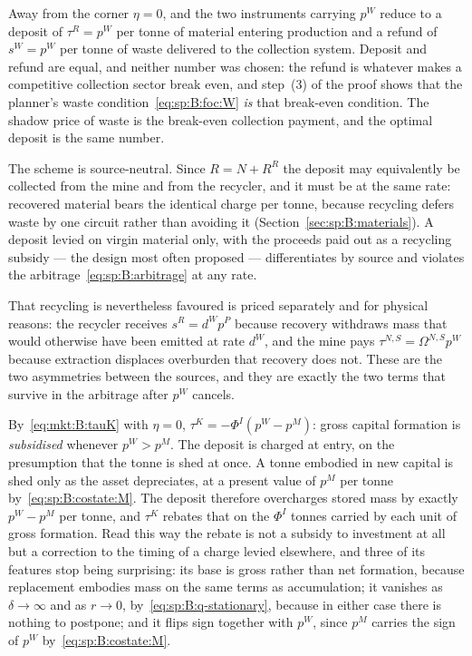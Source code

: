  Away from the corner $\eta=0$, and
the two instruments carrying $p^W$ reduce to a deposit of $\tau^R=p^W$ per tonne of material entering
production and a refund of $s^W=p^W$ per tonne of waste delivered to the collection system. Deposit and
refund are equal, and neither number was chosen: the refund is whatever makes a competitive collection
sector break even, and step~(3) of the proof shows that the planner's waste
condition~\eqref{eq:sp:B:foc:W} \emph{is} that break-even condition. The shadow price of waste is the
break-even collection payment, and the optimal deposit is the same number.

The scheme is source-neutral. Since $R=N+R^R$ the deposit may equivalently be collected from the mine
and from the recycler, and it must be at the same rate: recovered material bears the identical charge
per tonne, because recycling defers waste by one circuit rather than avoiding it
(Section~\ref{sec:sp:B:materials}). A deposit levied on virgin material only, with the proceeds paid
out as a recycling subsidy --- the design most often proposed --- differentiates by source and violates
the arbitrage~\eqref{eq:sp:B:arbitrage} at any rate.

That recycling is nevertheless favoured is priced separately and for physical reasons: the recycler
receives $s^R=d^Wp^P$ because recovery withdraws mass that would otherwise have been emitted at rate
$d^W$, and the mine pays $\tau^{N,S}=\Omega^{N,S}p^W$ because extraction displaces overburden that
recovery does not. These are the two asymmetries between the sources, and they are exactly the two
terms that survive in the arbitrage after $p^W$ cancels.

 By~\eqref{eq:mkt:B:tauK} with
$\eta=0$, $\tau^K=-\Phi^I\left(p^W-p^M\right)$: gross capital formation is \emph{subsidised} whenever
$p^W>p^M$. The deposit is charged at entry, on the presumption that the tonne is shed at once. A tonne
embodied in new capital is shed only as the asset depreciates, at a present value of $p^M$ per tonne
by~\eqref{eq:sp:B:costate:M}. The deposit therefore overcharges stored mass by exactly $p^W-p^M$ per
tonne, and $\tau^K$ rebates that on the $\Phi^I$ tonnes carried by each unit of gross formation. Read
this way the rebate is not a subsidy to investment at all but a correction to the timing of a charge
levied elsewhere, and three of its features stop being surprising: its base is gross rather than net
formation, because replacement embodies mass on the same terms as accumulation; it vanishes as
$\delta\to\infty$ and as $r\to0$, by~\eqref{eq:sp:B:q-stationary}, because in either case there is
nothing to postpone; and it flips sign together with $p^W$, since $p^M$ carries the sign of $p^W$
by~\eqref{eq:sp:B:costate:M}.

